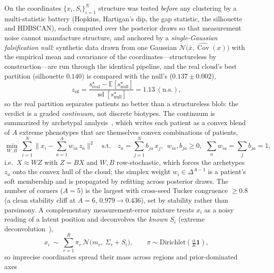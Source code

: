On the coordinates $\{x_i,S_i\}_{i=1}^{N}$ structure was tested \emph{before} any clustering
by a multi-statistic battery (Hopkins, Hartigan's dip, the gap statistic, the silhouette and
HDBSCAN), each computed over the posterior draws so that measurement noise cannot manufacture
structure, and anchored by a \emph{single-Gaussian falsification null}: synthetic data drawn
from one Gaussian $\mathcal N\!\big(\bar x,\widehat{\operatorname{Cov}}(x)\big)$ with the
empirical mean and covariance of the coordinates---structureless by construction---are run
through the identical pipeline, and the real cloud's best partition (silhouette $0.140$) is
compared with the null's ($0.137\pm0.002$),
\begin{equation}
  z_{\mathrm{sil}}=\frac{s^{\star}_{\mathrm{real}}-\mathbb E[s^{\star}_{\mathrm{null}}]}
  {\operatorname{sd}[s^{\star}_{\mathrm{null}}]}=1.13\ (\text{n.s.}),
  \label{eq:m-silz}
\end{equation}
so the real partition separates patients no better than a structureless blob: the verdict is a
graded \emph{continuum}, not discrete biotypes. The continuum is summarized by archetypal
analysis~\citep{cutler1994archetypal}, which writes each patient as a convex blend of $A$
extreme phenotypes that are themselves convex combinations of patients,
\begin{equation}
  \min_{W,B}\ \sum_{i=1}^{N}\Big\|x_i-\sum_{a=1}^{A} w_{ia}\,z_a\Big\|^{2}
  \quad\text{s.t.}\quad z_a=\sum_{j=1}^{N} b_{ja}\,x_j,\ \
  w_{ia},b_{ja}\ge0,\ \ \textstyle\sum_a w_{ia}=\sum_j b_{ja}=1 ,
  \label{eq:m-archetype}
\end{equation}
i.e.\ $X\approx WZ$ with $Z=BX$ and $W,B$ row-stochastic, which forces the archetypes $z_a$
onto the convex hull of the cloud; the simplex weight $w_i\in\Delta^{A-1}$ is a patient's soft
membership and is propagated by refitting across posterior draws. The number of corners
($A=5$) is the largest with cross-seed Tucker congruence $\ge0.8$ (a clean stability cliff at
$A=6$, $0.979\to0.436$), set by stability rather than parsimony. A complementary
measurement-error mixture treats $x_i$ as a noisy reading of a latent position and
deconvolves the \emph{known} $S_i$ (extreme deconvolution~\citep{bovy2011xd}),
\begin{equation}
  x_i\ \sim\ \sum_{r=1}^{R}\pi_r\,\mathcal N\!\big(m_r,\ \Sigma_r+S_i\big),\qquad
  \pi\sim\mathrm{Dirichlet}\!\left(\tfrac{\alpha}{R}\mathbf 1\right) ,
  \label{eq:m-xd}
\end{equation}
so imprecise coordinates spread their mass across regions and prior-dominated axes
